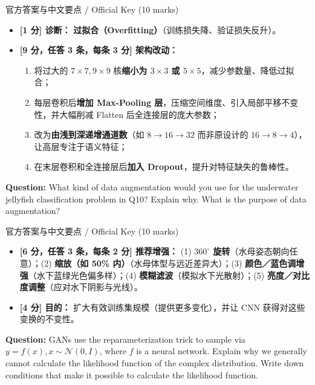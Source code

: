 \begin{StudySolution}{官方答案与中文要点 / Official Key (10 marks)}
\begin{itemize}
\item \textbf{[1 分] 诊断：} \textbf{过拟合（Overfitting）}（训练损失降、验证损失反升）。
\item \textbf{[9 分，任答 3 条，每条 3 分] 架构改动：}
  \begin{enumerate}
  \item 将过大的 $7\times 7, 9\times 9$ 核\textbf{缩小为 $3\times 3$ 或 $5\times 5$}，减少参数量、降低过拟合；
  \item 每层卷积后\textbf{增加 Max-Pooling 层}，压缩空间维度、引入局部平移不变性，并大幅削减 Flatten 后全连接层的庞大参数；
  \item 改为\textbf{由浅到深递增通道数}（如 $8\to 16\to 32$ 而非原设计的 $16\to 8\to 4$），让高层专注于语义特征；
  \item 在末层卷积和全连接层后\textbf{加入 Dropout}，提升对特征缺失的鲁棒性。
  \end{enumerate}
\end{itemize}
\end{StudySolution}

\textbf{Question:} What kind of data augmentation would you use for the underwater jellyfish classification problem in Q10? Explain why. What is the purpose of data augmentation?

\begin{StudySolution}{官方答案与中文要点 / Official Key (10 marks)}
\begin{itemize}
\item \textbf{[6 分，任答 3 条，每条 2 分] 推荐增强：} (1) \textbf{$360^\circ$ 旋转}（水母姿态朝向任意）；(2) \textbf{缩放（如 50\% 内）}（水母体型与远近差异大）；(3) \textbf{颜色／蓝色调增强}（水下蓝绿光色偏多样）；(4) \textbf{模糊滤波}（模拟水下光散射）；(5) \textbf{亮度／对比度调整}（应对水下阴影与光线）。
\item \textbf{[4 分] 目的：} 扩大有效训练集规模（提供更多变化），并让 CNN 获得对这些变换的不变性。
\end{itemize}
\end{StudySolution}

\textbf{Question:} GANs use the reparameterization trick to sample via $y=f(x), x\sim\mathcal{N}(0,I)$, where $f$ is a neural network. Explain why we generally cannot calculate the likelihood function of the complex distribution. Write down conditions that make it possible to calculate the likelihood function.

